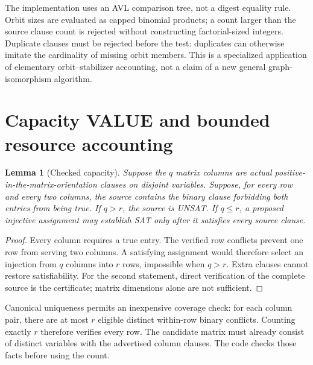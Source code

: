 \documentclass[11pt]{article}
\newtheorem{lemma}[theorem]{Lemma}
\begin{document}
The implementation uses an AVL comparison tree, not a digest equality rule.
Orbit sizes are evaluated as capped binomial products; a count larger than
the source clause count is rejected without constructing factorial-sized
integers. Duplicate clauses must be rejected before the test: duplicates can
otherwise imitate the cardinality of missing orbit members. This is a
specialized application of elementary orbit--stabilizer accounting, not a
claim of a new general graph-isomorphism algorithm.

\section{Capacity VALUE and bounded resource accounting}
\begin{lemma}[Checked capacity]
Suppose the $q$ matrix columns are actual positive-in-the-matrix-orientation
clauses on disjoint variables. Suppose, for every row and every two columns,
the source contains the binary clause forbidding both entries from being
true. If $q>r$, the source is UNSAT. If $q\le r$, a proposed injective
assignment may establish SAT only after it satisfies \emph{every} source
clause.
\end{lemma}
\begin{proof}
Every column requires a true entry. The verified row conflicts prevent one
row from serving two columns. A satisfying assignment would therefore select
an injection from $q$ columns into $r$ rows, impossible when $q>r$. Extra
clauses cannot restore satisfiability. For the second statement, direct
verification of the complete source is the certificate; matrix dimensions
alone are not sufficient.
\end{proof}

Canonical uniqueness permits an inexpensive coverage check: for each column
pair, there are at most $r$ eligible distinct within-row binary conflicts.
Counting exactly $r$ therefore verifies every row. The candidate matrix must
already consist of distinct variables with the advertised column clauses.
The code checks those facts before using the count.
\end{document}
